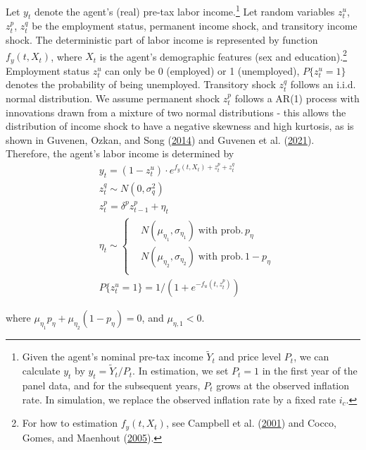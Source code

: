 \documentclass[
  12pt,
]{article}
\begin{document}
Let \(y_t\) denote the agent's (real) pre-tax labor income.\footnote{Given
  the agent's nominal pre-tax income \(\tilde{Y}_t\) and price level
  \(P_t\), we can calculate \(y_t\) by \(y_t = \tilde{Y}_t/P_t\). In
  estimation, we set \(P_t=1\) in the first year of the panel data, and
  for the subsequent years, \(P_t\) grows at the observed inflation
  rate. In simulation, we replace the observed inflation rate by a fixed
  rate \(i_c\).} Let random variables \(z^u_t\), \(z^p_t\), \(z^q_t\) be
the employment status, permanent income shock, and transitory income
shock. The deterministic part of labor income is represented by function
\(f_y(t,X_t)\), where \(X_t\) is the agent's demographic features (sex
and education).\footnote{For how to estimation \(f_y(t,X_t)\), see
  Campbell et al.
  (\protect\hyperlink{ref-campbell_investing_2001}{2001}) and Cocco,
  Gomes, and Maenhout
  (\protect\hyperlink{ref-cocco_consumption_2005}{2005}).} Employment
status \(z^u_t\) can only be 0 (employed) or 1 (unemployed),
\(P\{z^u_t=1\}\) denotes the probability of being unemployed. Transitory
shock \(z^q_t\) follows an i.i.d. normal distribution. We assume
permanent shock \(z^p_t\) follows a AR(1) process with innovations drawn
from a mixture of two normal distributions - this allows the
distribution of income shock to have a negative skewness and high
kurtosis, as is shown in Guvenen, Ozkan, and Song
(\protect\hyperlink{ref-guvenen_nature_2014}{2014}) and Guvenen et al.
(\protect\hyperlink{ref-guvenen_what_2021}{2021}). Therefore, the
agent's labor income is determined by \begin{equation}\begin{aligned}
& y_t = (1-z^u_t)\cdot e^{f_y(t,X_t) + z^p_t + z^q_t} \\
& z^q_t \sim N(0,\sigma_q^2) \\
& z^p_t = \delta^pz^p_{t-1} + \eta_t \\
& \eta_t \sim \left\{
\begin{aligned}
& N(\mu_{\eta_1},\sigma_{\eta_1}) \; \text{with prob.} \,p_\eta \\
& N(\mu_{\eta_2},\sigma_{\eta_2}) \; \text{with prob.} \,1-p_\eta\\
\end{aligned}
\right. \\
& P\{z^u_t=1\} = 1/(1+e^{-f_u(t,z^p_t)})
\end{aligned}
\end{equation}

where \(\mu_{\eta_1}p_\eta + \mu_{\eta_2}(1-p_\eta)=0\), and
\(\mu_{\eta,1}<0\).
\end{document}
